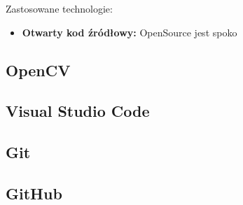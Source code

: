 Zastosowane technologie:

\begin{itemize}
    \item \textbf{Otwarty kod źródłowy:} OpenSource jest spoko
    
\end{itemize}


\subsection{OpenCV}
\subsection{Visual Studio Code}
\subsection{Git}
\subsection{GitHub}